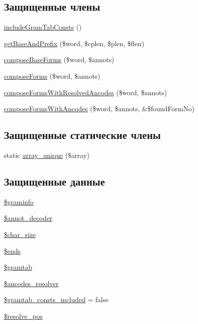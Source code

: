 \subsection*{Защищенные члены}
\begin{DoxyCompactItemize}
\item 
\hyperlink{classphpMorphy__Morphier__Helper_ab60e0829f377388fe41f4fa36856d2ca}{includeGramTabConsts} ()
\item 
\hyperlink{classphpMorphy__Morphier__Helper_a0c3e892b1c621ca67f0e3b0add8874d0}{getBaseAndPrefix} (\$word, \$cplen, \$plen, \$flen)
\item 
\hyperlink{classphpMorphy__Morphier__Helper_aa0b6a64b09dc2995c2c2f13156706dcc}{composeBaseForms} (\$word, \$annots)
\item 
\hyperlink{classphpMorphy__Morphier__Helper_a685fbf26b4d9b2669d13e3e30e8ba1f1}{composeForms} (\$word, \$annots)
\item 
\hyperlink{classphpMorphy__Morphier__Helper_a00b3e60552e6852ad56dcbc6f37ad452}{composeFormsWithResolvedAncodes} (\$word, \$annots)
\item 
\hyperlink{classphpMorphy__Morphier__Helper_a431dbb48e43c4c44c8ca8aec6340cb9a}{composeFormsWithAncodes} (\$word, \$annots, \&\$foundFormNo)
\end{DoxyCompactItemize}
\subsection*{Защищенные статические члены}
\begin{DoxyCompactItemize}
\item 
static \hyperlink{classphpMorphy__Morphier__Helper_a22915426ed9c279326d89028791937f2}{array\_\-unique} (\$array)
\end{DoxyCompactItemize}
\subsection*{Защищенные данные}
\begin{DoxyCompactItemize}
\item 
\hyperlink{classphpMorphy__Morphier__Helper_a161eae1e122573b4c3ebaf136f0265e6}{\$graminfo}
\item 
\hyperlink{classphpMorphy__Morphier__Helper_af8b933c5269f4b067a024c55600c01ba}{\$annot\_\-decoder}
\item 
\hyperlink{classphpMorphy__Morphier__Helper_abde294a685b30915cff08dd32bd2a2c6}{\$char\_\-size}
\item 
\hyperlink{classphpMorphy__Morphier__Helper_af5c59000b5323b137555001c448da8f4}{\$ends}
\item 
\hyperlink{classphpMorphy__Morphier__Helper_af04fce42bb731483c1f2d9ef825ff658}{\$gramtab}
\item 
\hyperlink{classphpMorphy__Morphier__Helper_a16ea161e8896853c42c3ee6668397c13}{\$ancodes\_\-resolver}
\item 
\hyperlink{classphpMorphy__Morphier__Helper_a73079a526fb2c21cedd3f8067597e49c}{\$gramtab\_\-consts\_\-included} = false
\item 
\hyperlink{classphpMorphy__Morphier__Helper_a03d35907d83e749956ee0eefe238b119}{\$resolve\_\-pos}
\end{DoxyCompactItemize}



